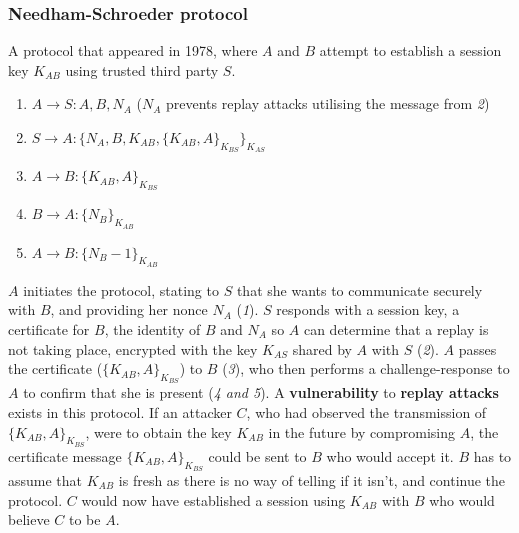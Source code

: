 \documentclass{article}
\begin{document}
\subsubsection{Needham-Schroeder protocol}
A protocol that appeared in 1978, where $ A $ and $ B $ attempt to establish a session key $ K_{AB} $ using trusted third party $ S $.
\begin{enumerate}
	\item $ A \rightarrow S : A, B, N_{A} $ \hspace{6pt} ($ N_{A} $ prevents replay attacks utilising the message from \textit{2})
	\item $ S \rightarrow A : \{ N_{A}, B, K_{AB}, \{ K_{AB}, A \}_{K_{BS}} \}_{K_{AS}} $
	\item $ A \rightarrow B : \{ K_{AB}, A \}_{K_{BS}} $
	\item $ B \rightarrow A : \{ N_{B} \}_{K_{AB}}  $
	\item $ A \rightarrow B : \{ N_{B} - 1 \}_{K_{AB}} $
\end{enumerate}
$ A $ initiates the protocol, stating to $ S $ that she wants to communicate securely with $ B $, and providing her nonce $ N_{A} $ (\textit{1}). $ S $ responds with a session key, a certificate for $ B $, the identity of $ B $ and $ N_{A} $ so $ A $ can determine that a replay is not taking place, encrypted with the key $ K_{AS} $ shared by $ A $ with $ S $ (\textit{2}). $ A $ passes the certificate ($ \{ K_{AB}, A \}_{K_{BS}} $) to $ B $ (\textit{3}), who then performs a challenge-response to $ A $ to confirm that she is present (\textit{4 and 5}). A \textbf{vulnerability} to \textbf{replay attacks} exists in this protocol. If an attacker $ C $, who had observed the transmission of $ \{ K_{AB}, A \}_{K_{BS}} $, were to obtain the key $ K_{AB} $ in the future by compromising $ A $, the certificate message $ \{ K_{AB}, A \}_{K_{BS}} $ could be sent to $ B $ who would accept it. $ B $ has to assume that $ K_{AB} $ is fresh as there is no way of telling if it isn't, and continue the protocol. $ C $ would now have established a session using $ K_{AB} $ with $ B $ who would believe $ C $ to be $ A $.
\end{document}
